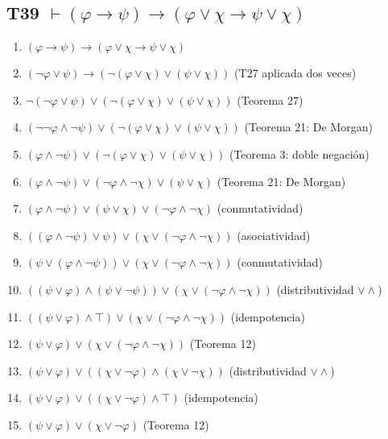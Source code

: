 \subsection{T39 $\vdash (\varphi \rightarrow \psi) \rightarrow (\varphi \lor \chi \rightarrow \psi \lor \chi)$}

\begin{enumerate}
    \item $(\varphi \rightarrow \psi) \rightarrow (\varphi \lor \chi \rightarrow \psi \lor \chi)$
    \item $(\neg\varphi \lor \psi) \rightarrow (\neg(\varphi \lor \chi) \lor (\psi \lor \chi))$ \hfill (T27 aplicada dos veces)
    \item $\neg(\neg\varphi \lor \psi) \lor (\neg(\varphi \lor \chi) \lor (\psi \lor \chi))$ \hfill (Teorema 27)
    \item $(\neg\neg\varphi \land \neg\psi) \lor (\neg(\varphi \lor \chi) \lor (\psi \lor \chi))$ \hfill (Teorema 21: De Morgan)
    \item $(\varphi \land \neg\psi) \lor (\neg(\varphi \lor \chi) \lor (\psi \lor \chi))$ \hfill (Teorema 3: doble negación)
    \item $(\varphi \land \neg\psi) \lor (\neg\varphi \land \neg\chi) \lor (\psi \lor \chi)$ \hfill (Teorema 21: De Morgan)
    \item $(\varphi \land \neg\psi) \lor (\psi \lor \chi) \lor(\neg\varphi \land \neg\chi) $ \hfill (conmutatividad)
    \item $((\varphi \land \neg\psi) \lor \psi) \lor (\chi \lor(\neg\varphi \land \neg\chi)) $ \hfill (asociatividad)
    \item $(\psi \lor (\varphi \land \neg\psi)) \lor (\chi \lor(\neg\varphi \land \neg\chi)) $ \hfill (conmutatividad)
    \item $((\psi \lor \varphi) \land (\psi \lor \neg\psi)) \lor (\chi \lor(\neg\varphi \land \neg\chi)) $ \hfill (distributividad $\lor\land$)
    \item $((\psi \lor \varphi) \land \top) \lor (\chi \lor(\neg\varphi \land \neg\chi)) $ \hfill (idempotencia)
    \item $(\psi \lor \varphi) \lor (\chi \lor(\neg\varphi \land \neg\chi)) $ \hfill (Teorema 12)
    \item $(\psi \lor \varphi) \lor ((\chi \lor \neg\varphi) \land (\chi \lor \neg\chi)) $ \hfill (distributividad $\lor\land$)
    \item $(\psi \lor \varphi) \lor ((\chi \lor \neg\varphi) \land \top) $ \hfill (idempotencia)
    \item $(\psi \lor \varphi) \lor (\chi \lor \neg\varphi) $ \hfill (Teorema 12)

\end{enumerate}
